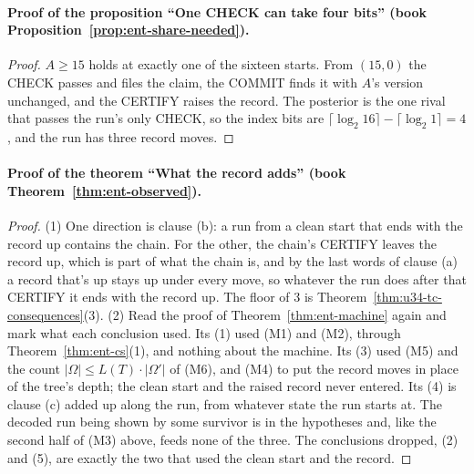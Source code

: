 \documentclass[11pt,twoside]{article}
\theoremstyle{thielethm}
\theoremstyle{thieledef}
\theoremstyle{thieledef}
\theoremstyle{thieledef}
\theoremstyle{thielethm}
\theoremstyle{thieleobs}
\theoremstyle{thielethm}
\begin{document}
\paragraph{Proof of the proposition ``One CHECK can take four bits'' (book Proposition~\ref{prop:ent-share-needed}).}
\begin{proof}
$A \ge 15$ holds at exactly one of the sixteen starts. From $(15, 0)$ the CHECK passes and files the
claim, the COMMIT finds it with $A$'s version unchanged, and the CERTIFY raises the record. The
posterior is the one rival that passes the run's only CHECK, so the index bits are
$\lceil \log_2 16 \rceil - \lceil \log_2 1 \rceil = 4$, and the run has three record moves.
\end{proof}

\paragraph{Proof of the theorem ``What the record adds'' (book Theorem~\ref{thm:ent-observed}).}
\begin{proof}
(1) One direction is clause (b): a run from a clean start that ends with the record up contains the
chain. For the other, the chain's CERTIFY leaves the record up, which is part of what the chain
is, and by the last words of clause (a) a record that's up stays up under every move, so whatever the run does after that CERTIFY it ends
with the record up. The floor of 3 is Theorem~\ref{thm:u34-tc-consequences}(3). (2) Read the proof of
Theorem~\ref{thm:ent-machine} again and mark what each conclusion used. Its (1) used (M1) and (M2),
through Theorem~\ref{thm:ent-cs}(1), and nothing about the machine. Its (3) used (M5) and the count
$|\Omega| \le L(T) \cdot |\Omega'|$ of (M6), and (M4) to put the record moves in place of the
tree's depth; the clean start and the raised record never entered. Its (4) is clause (c) added up
along the run, from whatever state the run starts at. The decoded run being shown by some survivor
is in the hypotheses and, like the second half of (M3) above, feeds none of the three. The
conclusions dropped, (2) and (5), are exactly the two that used the clean start and the record.
\end{proof}
\end{document}
